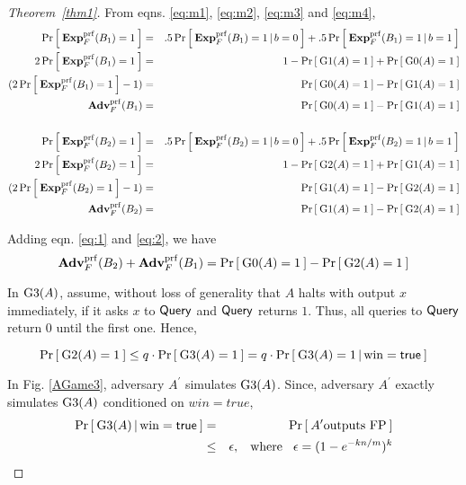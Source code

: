 \begin{proof}[Theorem~\ref{thm1}]
From eqns. \ref{eq:m1}, \ref{eq:m2}, \ref{eq:m3} and \ref{eq:m4},
\begin{eqnarray}
\nonumber \Pr\left[\: \mathbf{Exp}^{\mathrm{prf}}_{F}(B_1) = 1 \:\right] &=& .5\Pr\left[\: \mathbf{Exp}^{\mathrm{prf}}_{F}(B_1)=1\,|\,b=0 \:\right] + .5\Pr\left[\: \mathbf{Exp}^{\mathrm{prf}}_{F}(B_1) = 1\,|\,b=1 \:\right]\\
\nonumber 2\Pr\left[\: \mathbf{Exp}^{\mathrm{prf}}_{F}(B_1) = 1 \:\right] &=& 1-\Pr\left[\: \text{G1}(A)=1 \:\right] + \Pr\left[\: \text{G0}(A)=1 \:\right]\\
\nonumber (2\Pr\left[\: \mathbf{Exp}^{\mathrm{prf}}_{F}(B_1) = 1 \:\right] - 1)  &=& \Pr\left[\: \text{G0}(A)=1 \:\right] - \Pr\left[\: \text{G1}(A)=1 \:\right]\\
 \mathbf{Adv}^{\mathrm{prf}}_{F}(B_1) &=& \Pr\left[\: \text{G0}(A)=1 \:\right] - \Pr\left[\: \text{G1}(A)=1 \:\right] \label{eq:1}\\
\nonumber& &\\
\nonumber \Pr\left[\: \mathbf{Exp}^{\mathrm{prf}}_{F}(B_2) = 1 \:\right] &=& .5\Pr\left[\: \mathbf{Exp}^{\mathrm{prf}}_{F}(B_2)=1\,|\,b=0 \:\right] + .5\Pr\left[\: \mathbf{Exp}^{\mathrm{prf}}_{F}(B_2) = 1\,|\,b=1 \:\right]\\
\nonumber 2\Pr\left[\: \mathbf{Exp}^{\mathrm{prf}}_{F}(B_2) = 1 \:\right] &=& 1-\Pr\left[\: \text{G2}(A)=1 \:\right] + \Pr\left[\: \text{G1}(A)=1 \:\right]\\
\nonumber (2\Pr\left[\: \mathbf{Exp}^{\mathrm{prf}}_{F}(B_2) = 1 \:\right] - 1)  &=& \Pr\left[\: \text{G1}(A)=1 \:\right] - \Pr\left[\: \text{G2}(A)=1 \:\right]\\
 \mathbf{Adv}^{\mathrm{prf}}_{F}(B_2) &=& \Pr\left[\: \text{G1}(A)=1 \:\right] - \Pr\left[\: \text{G2}(A)=1 \:\right] \label{eq:2}
\end{eqnarray}

Adding eqn. \ref{eq:1} and \ref{eq:2}, we have
\begin{equation}
\mathbf{Adv}^{\mathrm{prf}}_{F}(B_2) +\mathbf{Adv}^{\mathrm{prf}}_{F}(B_1) = \Pr\left[\: \text{G0}(A)=1 \:\right] - \Pr\left[\: \text{G2}(A)=1 \:\right]\label{eq:2a}
\end{equation}

In $\text{G3}(A)$, assume, without loss of generality that $A$ halts with output $x$ immediately, if it asks $x$ to $\mathsf{Query}$ and $\mathsf{Query}$ returns $1$. Thus, all queries to $\mathsf{Query}$ return 0 until the first one. Hence,

\begin{equation}
\Pr\left[\: \text{G2}(A)=1 \:\right] \leq q \cdot \Pr\left[\: \text{G3}(A)=1 \:\right] = q \cdot \Pr\left[\: \text{G3}(A)=1\,|\,\mathrm{win}=\mathsf{true} \:\right]\label{eq:3}
\end{equation}

In Fig. \ref{AGame3}, adversary $A^{'}$ simulates $\text{G3}(A)$. Since, adversary $A^{'}$ exactly simulates $\text{G3}(A)$ conditioned on $win = true$, 
\begin{eqnarray}
\nonumber \Pr\left[\: \text{G3}(A)\,|\,\mathrm{win}=\mathsf{true} \:\right] &=& \Pr\left[\: A' \mbox{outputs FP} \:\right]\\
& \leq & \epsilon, \hspace*{2ex} \mathrm{where} \hspace*{2ex} \epsilon = (1-e^{-kn/m})^k\label{eq:4}
\end{eqnarray}


\end{proof}

